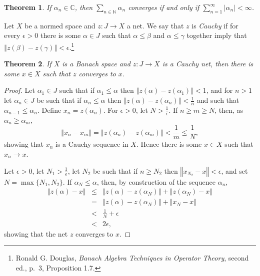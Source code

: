\documentclass{article}
\newcommand{\norm}[1]{\left\Vert #1 \right\Vert}
\newtheorem{theorem}{Theorem}
\begin{document}
\begin{theorem}
If $\alpha_n \in \mathbb{C}$, then $\sum_{n \in \mathbb{N}} \alpha_n$ converges if and only if
$\sum_{n=1}^\infty |\alpha_n|< \infty$.
\end{theorem}


Let $X$ be a normed space and $z:J \to X$ a net. We say that $z$ is {\em Cauchy} if for every $\epsilon>0$ there is some
$\alpha \in J$ such that $\alpha \leq \beta$ and $\alpha \leq \gamma$ together imply that
$\norm{z(\beta)-z(\gamma)}<\epsilon$.\footnote{Ronald G. Douglas, {\em Banach Algebra Techniques in Operator Theory}, 
second ed., p.~3, Proposition 1.7.}

\begin{theorem}
If $X$ is a Banach space and $z:J \to X$ is a Cauchy net, then there is some $x \in X$ such that $z$ converges to $x$.
\label{cauchynet}
\end{theorem}
\begin{proof}
Let $\alpha_1 \in J$ such that if $\alpha_1 \leq \alpha$ then $\norm{z(\alpha)-z(\alpha_1)}<1$, and for $n>1$ let
$\alpha_n \in J$ be such that if $\alpha_n \leq \alpha$ then $\norm{z(\alpha)-z(\alpha_n)}<\frac{1}{n}$ and such that
$\alpha_{n-1} \leq \alpha_n$. Define $x_n=z(\alpha_n)$. 
For $\epsilon>0$, let $N>\frac{1}{\epsilon}$. If $n \geq m \geq N$, then, as $\alpha_n \geq \alpha_m$,
\[
\norm{x_n-x_m} = \norm{z(\alpha_n)-z(\alpha_m)} < \frac{1}{m} \leq \frac{1}{N},
\]
showing that $x_n$ is a Cauchy sequence in $X$. Hence there is some $x \in X$ such that $x_n \to x$.

Let $\epsilon>0$, let $N_1>\frac{1}{\epsilon}$,  let $N_2$ be such that if $n \geq N_2$ then $\norm{x_{N_2}-x}<\epsilon$, and set $N=\max\{N_1,N_2\}$. If
$\alpha_N \leq \alpha$, then, by construction of the sequence $\alpha_n$,
\begin{eqnarray*}
\norm{z(\alpha)-x} &\leq& \norm{z(\alpha)-z(\alpha_N)}+\norm{z(\alpha_N)-x}\\
&=& \norm{z(\alpha)-z(\alpha_N)} + \norm{x_N-x}\\
&<&\frac{1}{N}+\epsilon\\
&<&2\epsilon,
\end{eqnarray*}
showing that the net
$z$ converges to $x$.
\end{proof}
\end{document}
